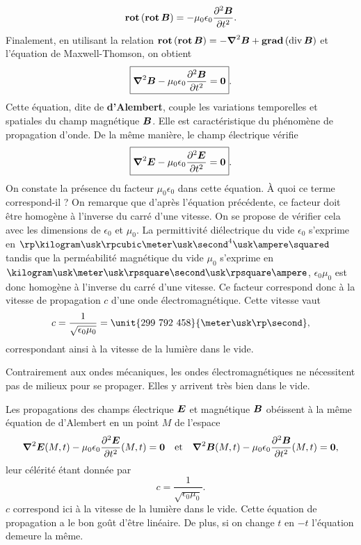 \begin{equation*}
	\rot(\rot \vecb) = -\mu_0 \epsilon_0 \dd{^2\vecb}{t^2}.
\end{equation*}
Finalement, en utilisant la relation $\rot(\rot \vecb) = - \laplacien \vecb 
+ \gradient(\div \vecb)$ et l'équation de Maxwell-Thomson, on obtient
\begin{equation*}
	\boxed{\laplacien \vecb - \mu_0 \epsilon_0 \dd{^2\vecb}{t^2} = \mathbf{0}}.
\end{equation*}
Cette équation, dite de \textbf{d'Alembert}, couple les variations temporelles
et spatiales du champ magnétique $\vecb$. Elle est caractéristique du phénomène
de propagation d'onde. De la même manière, le champ électrique vérifie
\begin{equation*}
	\boxed{\laplacien \vece - \mu_0 \epsilon_0 \dd{^2\vece}{t^2} = \mathbf{0}}.
\end{equation*}
On constate la présence du facteur $\mu_0 \epsilon_0$ dans cette équation. 
À quoi ce terme correspond-il ? On remarque que d'après l'équation précédente, ce 
facteur doit être homogène à l'inverse du carré d'une vitesse. 
On se propose de vérifier cela avec les dimensions de $\epsilon_0$ 
et $\mu_0$. La permittivité diélectrique du vide $\epsilon_0$ s'exprime en 
$\rp \kilogram \usk \rpcubic \meter \usk \second^4 \usk \ampere \squared$ 
tandis que la perméabilité magnétique du vide $\mu_0$ s'exprime en 
$\kilogram \usk \meter \usk \rpsquare \second \usk \rpsquare \ampere$, 
$\epsilon_0 \mu_0$ est donc homogène à l'inverse du carré d'une vitesse. Ce facteur
correspond donc à la vitesse de propagation $c$ d'une onde électromagnétique. 
Cette vitesse vaut
\begin{equation*}
	c = \dfrac{1}{\sqrt{\epsilon_0 \mu_0}} = \unit{299\ 792\ 458}{\meter 
	\usk \rp \second},
\end{equation*}
correspondant ainsi à la vitesse de la lumière dans le vide.

\begin{rem}
	Contrairement aux ondes mécaniques, les ondes électromagnétiques ne
	nécessitent pas de milieux pour se propager. Elles y arrivent très bien
	dans le vide.
\end{rem}

\begin{defn}
	Les propagations des champs électrique $\vece$ et magnétique $\vecb$ obéissent 
	à la même équation de d'Alembert en un point $M$ de l'espace
	\begin{equation}
	\laplacien \vece(M, t) - \mu_0 \epsilon_0 \dd{^2\vece}{t^2}(M, t) = \mathbf{0}
	\quad \mathrm{et} \quad
	\laplacien \vecb(M, t) - \mu_0 \epsilon_0 \dd{^2\vecb}{t^2}(M, t) = \mathbf{0},
	\end{equation}
	leur célérité étant donnée par 
	\begin{equation*}
		c = \dfrac{1}{\sqrt{\epsilon_0 \mu_0}}.
	\end{equation*}
	$c$ correspond ici à la vitesse de la lumière dans le vide. Cette équation
	de propagation a le bon goût d'être linéaire. De plus, si on change $t$
	en $-t$ l'équation demeure la même.
\end{defn}


